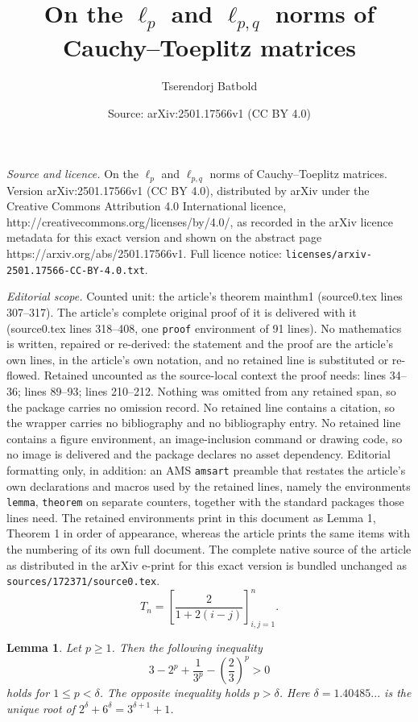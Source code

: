 \documentclass[10pt,a4paper]{amsart}
\title{On the $\ell_p$ and $\ell_{p,q}$ norms of Cauchy--Toeplitz matrices}
\author{Tserendorj Batbold}
\date{Source: arXiv:2501.17566v1 (CC BY 4.0)}
\newtheorem{lemma}{Lemma}
\begin{document}
\maketitle

\noindent\emph{Source and licence.} On the $\ell_p$ and $\ell_{p,q}$ norms of Cauchy--Toeplitz matrices. Version arXiv:2501.17566v1 (CC BY 4.0), distributed by arXiv under the Creative Commons Attribution 4.0 International licence, http://creativecommons.org/licenses/by/4.0/, as recorded in the arXiv licence metadata for this exact version and shown on the abstract page https://arxiv.org/abs/2501.17566v1. Full licence notice: \texttt{licenses/arxiv-2501.17566-CC-BY-4.0.txt}.\par\smallskip

\noindent\textit{Editorial scope.} Counted unit: the article's theorem mainthm1 (source0.tex lines 307--317). The article's complete original proof of it is delivered with it (source0.tex lines 318--408, one \texttt{proof} environment of 91 lines). No mathematics is written, repaired or re-derived: the statement and the proof are the article's own lines, in the article's own notation, and no retained line is substituted or re-flowed.  Retained uncounted as the source-local context the proof needs: lines 34--36; lines 89--93; lines 210--212.  Nothing was omitted from any retained span, so the package carries no omission record.  No retained line contains a citation, so the wrapper carries no bibliography and no bibliography entry.  No retained line contains a figure environment, an image-inclusion command or drawing code, so no image is delivered and the package declares no asset dependency.  Editorial formatting only, in addition: an AMS \texttt{amsart} preamble that restates the article's own declarations and macros used by the retained lines, namely the environments \texttt{lemma}, \texttt{theorem} on separate counters, together with the standard packages those lines need.  The retained environments print in this document as Lemma 1, Theorem 1 in order of appearance, whereas the article prints the same items with the numbering of its own full document.  The complete native source of the article as distributed in the arXiv e-print for this exact version is bundled unchanged as \texttt{sources/172371/source0.tex}.
\begin{equation}\label{matrix}
   T_n=\left[\frac{2}{1+2(i-j)}\right]_{i, j=1}^n.
\end{equation}

\begin{lemma}\label{lem2}
    Let $p\geq1$. Then the following inequality
    $$3-2^p+\frac{1}{3^p}-\left(\frac{2}{3}\right)^p>0$$
    holds for $1\leq p<\delta$. The opposite inequality holds $p>\delta$. Here $\delta=1.40485...$ is the unique root of $2^\delta + 6^\delta = 3^{\delta + 1} + 1$.
\end{lemma}
\end{document}
